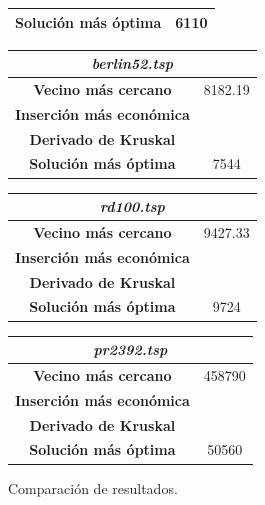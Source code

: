 \documentclass[12pt,spanish]{article}
\begin{document}
\begin{figure}[H]
\begin{tabular}{|c|c|}
\textbf{Solución más óptima} & 6110\\
\hline	
\end{tabular}
\vspace{0.5cm}
\quad
\begin{tabular}{|c|c|}
\hline	
\multicolumn{2}{|c|}{\textit{berlin52.tsp}}\\
\hline
\textbf{Vecino más cercano} & 8182.19\\
\textbf{Inserción más económica} & \\
\textbf{Derivado de Kruskal} & \\
\textbf{Solución más óptima} & 7544\\
\hline	
\end{tabular}
\vspace{0.5cm}
\quad
\begin{tabular}{|c|c|}
\hline	
\multicolumn{2}{|c|}{\textit{rd100.tsp}}\\
\hline
\textbf{Vecino más cercano} & 9427.33\\
\textbf{Inserción más económica} & \\
\textbf{Derivado de Kruskal} & \\
\textbf{Solución más óptima} & 9724\\
\hline	
\end{tabular}
\vspace{0.5cm}
\quad
\begin{tabular}{|c|c|}
\hline	
\multicolumn{2}{|c|}{\textit{pr2392.tsp}}\\
\hline
\textbf{Vecino más cercano} & 458790\\
\textbf{Inserción más económica} & \\
\textbf{Derivado de Kruskal} & \\
\textbf{Solución más óptima} & 50560\\
\hline	
\end{tabular}
\caption{Comparación de resultados.}
\end{figure}
\end{document}
